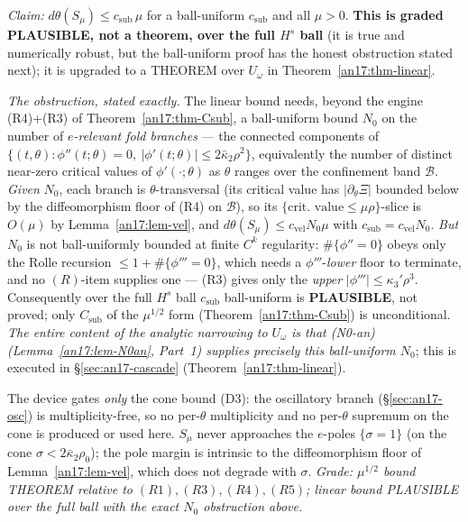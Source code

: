 \begin{remark}\label{an17:cl-linear}
\emph{Claim:} $d\theta(S_\mu)\le c_{\mathrm{sub}}\,\mu$ for a ball-uniform
$c_{\mathrm{sub}}$ and all $\mu>0$. \textbf{This is graded PLAUSIBLE, not a
theorem, over the full $H^s$ ball} (it is true and numerically robust, but the
ball-uniform proof has the honest obstruction stated next); it is upgraded to a
THEOREM over $U_\omega$ in Theorem~\ref{an17:thm-linear}.
\end{remark}

\emph{The obstruction, stated exactly.} The linear bound needs, beyond the engine
(R4)+(R3) of Theorem~\ref{an17:thm-Csub}, a ball-uniform bound $N_0$ on the number
of \emph{$e$-relevant fold branches} --- the connected components of
$\{(t,\theta):\phi''(t;\theta)=0,\ |\phi'(t;\theta)|\le2\bar\kappa_2\rho^2\}$,
equivalently the number of distinct near-zero critical values of
$\phi'(\cdot;\theta)$ as $\theta$ ranges over the confinement band
$\mathcal B$. \emph{Given} $N_0$, each branch is $\theta$-transversal (its
critical value has $|\partial_\theta\Xi|$ bounded below by the diffeomorphism
floor of (R4) on $\mathcal B$), so its $\{\text{crit.\ value}\le\mu\rho\}$-slice is
$O(\mu)$ by Lemma~\ref{an17:lem-vel}, and $d\theta(S_\mu)\le c_{\mathrm{vel}}N_0
\mu$ with $c_{\mathrm{sub}}=c_{\mathrm{vel}}N_0$. \emph{But} $N_0$ is not
ball-uniformly bounded at finite $C^k$ regularity: $\#\{\phi''=0\}$ obeys only the
Rolle recursion $\le1+\#\{\phi'''=0\}$, which needs a $\phi'''$-\emph{lower} floor
to terminate, and no $(R)$-item supplies one --- (R3) gives only the \emph{upper}
$|\phi'''|\le\kappa_3'\rho^3$. Consequently over the full $H^s$ ball
$c_{\mathrm{sub}}$ ball-uniform is \textbf{PLAUSIBLE}, not proved; only
$C_{\mathrm{sub}}$ of the $\mu^{1/2}$ form (Theorem~\ref{an17:thm-Csub}) is
unconditional. \emph{The entire content of the analytic narrowing to $U_\omega$
is that {\rm(N0-an)} (Lemma~\ref{an17:lem-N0an}, Part~1) supplies precisely this
ball-uniform $N_0$}; this is executed in \S\ref{sec:an17-cascade}
(Theorem~\ref{an17:thm-linear}).

\begin{remark}\label{an17:rem-devrole}
The device gates \emph{only} the cone bound (D3): the oscillatory branch
(\S\ref{sec:an17-osc}) is multiplicity-free, so no per-$\theta$
multiplicity and no per-$\theta$ supremum on the cone is produced or used here.
$S_\mu$ never approaches the $e$-poles $\{\sigma=1\}$ (on the cone
$\sigma<2\bar\kappa_2\rho_0$); the pole margin is intrinsic to the diffeomorphism
floor of Lemma~\ref{an17:lem-vel}, which does not degrade with $\sigma$. \emph{Grade:
$\mu^{1/2}$ bound {\rm THEOREM} relative to $(R1),(R3),(R4),(R5)$; linear bound
{\rm PLAUSIBLE} over the full ball with the exact $N_0$ obstruction above.}
\end{remark}

